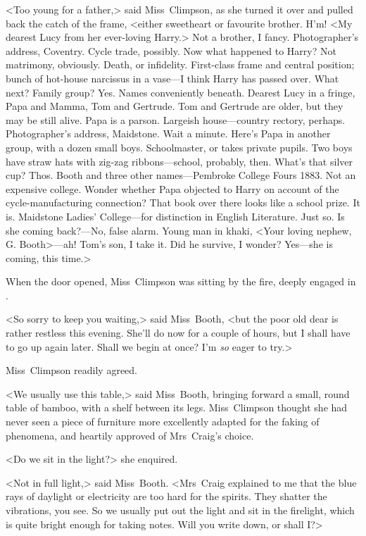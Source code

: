 <Too young for a father,> said Miss~Climpson, as she turned it over and pulled back the catch of the frame, <either sweetheart or favourite brother. H'm! <My dearest Lucy from her ever-loving Harry.> Not a brother, I fancy. Photographer's address, Coventry. Cycle trade, possibly. Now what happened to Harry? Not matrimony, obviously. Death, or infidelity. First-class frame and central position; bunch of hot-house narcissus in a vase—I think Harry has passed over. What next? Family group? Yes. Names conveniently beneath. Dearest Lucy in a fringe, Papa and Mamma, Tom and Gertrude. Tom and Gertrude are older, but they may be still alive. Papa is a parson. Largeish house—country rectory, perhaps. Photographer's address, Maidstone. Wait a minute. Here's Papa in another group, with a dozen small boys. Schoolmaster, or takes private pupils. Two boys have straw hats with zig-zag ribbons—school, probably, then. What's that silver cup? Thos. Booth and three other names—Pembroke College Fours 1883. Not an expensive college. Wonder whether Papa objected to Harry on account of the cycle-manufacturing connection? That book over there looks like a school prize. It is. Maidstone Ladies' College—for distinction in English Literature. Just so. Is she coming back?—No, false alarm. Young man in khaki, <Your loving nephew, G. Booth>—ah! Tom's son, I take it. Did he survive, I wonder? Yes—she is coming, this time.>

When the door opened, Miss~Climpson was sitting by the fire, deeply engaged in .

<So sorry to keep you waiting,> said Miss~Booth, <but the poor old dear is rather restless this evening. She'll do now for a couple of hours, but I shall have to go up again later. Shall we begin at once? I'm \emph{so} eager to try.>

Miss~Climpson readily agreed.

<We usually use this table,> said Miss~Booth, bringing forward a small, round table of bamboo, with a shelf between its legs. Miss~Climpson thought she had never seen a piece of furniture more excellently adapted for the faking of phenomena, and heartily approved of Mrs~Craig's choice.

<Do we sit in the light?> she enquired.

<Not in full light,> said Miss~Booth. <Mrs~Craig explained to me that the blue rays of daylight or electricity are too hard for the spirits. They shatter the vibrations, you see. So we usually put out the light and sit in the firelight, which is quite bright enough for taking notes. Will you write down, or shall I?>

